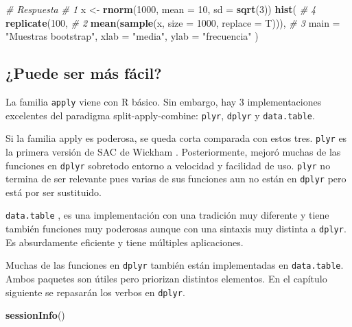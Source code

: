 \documentclass[]{article}
\newenvironment{Shaded}{\begin{snugshade}}{\end{snugshade}}
\newcommand{\KeywordTok}[1]{\textcolor[rgb]{0.13,0.29,0.53}{\textbf{{#1}}}}
\newcommand{\DataTypeTok}[1]{\textcolor[rgb]{0.13,0.29,0.53}{{#1}}}
\newcommand{\DecValTok}[1]{\textcolor[rgb]{0.00,0.00,0.81}{{#1}}}
\newcommand{\StringTok}[1]{\textcolor[rgb]{0.31,0.60,0.02}{{#1}}}
\newcommand{\CommentTok}[1]{\textcolor[rgb]{0.56,0.35,0.01}{\textit{{#1}}}}
\newcommand{\NormalTok}[1]{{#1}}
\begin{document}
\begin{Shaded}
\begin{Highlighting}[]
\CommentTok{# Respuesta}
\CommentTok{# 1}
\NormalTok{x <-}\StringTok{ }\KeywordTok{rnorm}\NormalTok{(}\DecValTok{1000}\NormalTok{, }\DataTypeTok{mean =} \DecValTok{10}\NormalTok{, }\DataTypeTok{sd =} \KeywordTok{sqrt}\NormalTok{(}\DecValTok{3}\NormalTok{))}
\KeywordTok{hist}\NormalTok{( }\CommentTok{# 4}
  \KeywordTok{replicate}\NormalTok{(}\DecValTok{100}\NormalTok{, }\CommentTok{# 2}
            \KeywordTok{mean}\NormalTok{(}\KeywordTok{sample}\NormalTok{(x, }\DataTypeTok{size =} \DecValTok{1000}\NormalTok{, }\DataTypeTok{replace =} \NormalTok{T))), }\CommentTok{# 3}
  \DataTypeTok{main =} \StringTok{"Muestras bootstrap"}\NormalTok{,}
  \DataTypeTok{xlab =} \StringTok{"media"}\NormalTok{,}
  \DataTypeTok{ylab =} \StringTok{"frecuencia"}
\NormalTok{)}
\end{Highlighting}
\end{Shaded}

\subsection{¿Puede ser más fácil?}\label{puede-ser-mas-facil}

La familia \texttt{apply} viene con R básico. Sin embargo, hay 3
implementaciones excelentes del paradigma split-apply-combine:
\texttt{plyr}, \texttt{dplyr} y \texttt{data.table}.

Si la familia apply es poderosa, se queda corta comparada con estos
tres. \texttt{plyr} es la primera versión de SAC de Wickham
\parencite{wickham2011split}. Posteriormente, mejoró muchas de las
funciones en \texttt{dplyr} \parencite{dplyr} sobretodo entorno a
velocidad y facilidad de uso. \texttt{plyr} no termina de ser relevante
pues varias de sus funciones aun no están en \texttt{dplyr} pero está
por ser sustituido.

\texttt{data.table} \parencite{datatable}, es una implementación con una
tradición muy diferente y tiene también funciones muy poderosas aunque
con una sintaxis muy distinta a \texttt{dplyr}. Es absurdamente
eficiente y tiene múltiples aplicaciones.

Muchas de las funciones en \texttt{dplyr} también están implementadas en
\texttt{data.table}. Ambos paquetes son útiles pero priorizan distintos
elementos. En el capítulo siguiente se repasarán los verbos en
\texttt{dplyr}.

\begin{Shaded}
\begin{Highlighting}[]
\KeywordTok{sessionInfo}\NormalTok{()}
\end{Highlighting}
\end{Shaded}
\end{document}
